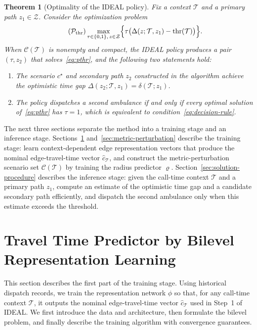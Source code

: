 \documentclass[11pt, letterpaper, oneside, reqno]{amsart}
\newcommand{\opt}{^\star}
\newtheorem{theorem}{Theorem}
\begin{document}
\begin{theorem}[Optimality of the IDEAL policy]
\label{thm:ideal_optimality}
Fix a context $\mathcal T$ and a primary path $z_1 \in \mathcal Z$. Consider the optimization problem
\begin{equation}
\label{eq:pthr}
\tag{$\mathcal P_{\text{thr}}$}
\max_{\tau\in\{0,1\},\,z\in\mathcal Z} \Bigl\{ \tau\bigl( \Delta(z;\mathcal T,z_1) - \mathrm{thr}(\mathcal T) \bigr) \Bigr\}.
\end{equation}
When $\mathcal C(\mathcal T)$ is nonempty and compact, the IDEAL policy produces a pair $(\tau,z_2)$ that solves~\eqref{eq:pthr}, and the following two statements hold:
\begin{enumerate}[leftmargin=7mm]
\item The scenario $c\opt$ and secondary path $z_2$ constructed in the algorithm achieve the optimistic time gap $\Delta(z_2;\mathcal T,z_1) = \delta(\mathcal T; z_1)$.
\item The policy dispatches a second ambulance if and only if every optimal solution of~\eqref{eq:pthr} has $\tau=1$, which is equivalent to condition~\eqref{eq:decision-rule}.
\end{enumerate}
\end{theorem}

The next three sections separate the method into a training stage and an inference stage. Sections~\ref{sec:bilevel-representation-learning} and~\ref{sec:metric-perturbation} describe the training stage: learn context-dependent edge representation vectors that produce the nominal edge-travel-time vector $\hat c_{\mathcal T}$, and construct the metric-perturbation scenario set $\mathcal C(\mathcal T)$ by training the radius predictor $\varrho$. Section~\ref{sec:solution-procedure} describes the inference stage: given the call-time context $\mathcal T$ and a primary path $z_1$, compute an estimate of the optimistic time gap and a candidate secondary path efficiently, and dispatch the second ambulance only when this estimate exceeds the threshold.


\section{Travel Time Predictor by Bilevel Representation Learning}
\label{sec:bilevel-representation-learning}
This section describes the first part of the training stage. Using historical dispatch records, we train the representation network $\phi$ so that, for any call-time context $\mathcal T$, it outputs the nominal edge-travel-time vector $\hat c_{\mathcal T}$ used in Step~1 of IDEAL. We first introduce the data and architecture, then formulate the bilevel problem, and finally describe the training algorithm with convergence guarantees.
\end{document}
